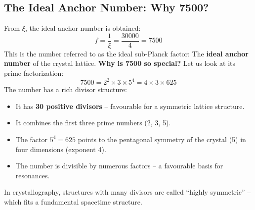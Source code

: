 	\subsection{The Ideal Anchor Number: Why 7500?}
	From \(\xi\), the ideal anchor number is obtained:
	\begin{equation}
		\boxed{f = \frac{1}{\xi} = \frac{30000}{4} = 7500}
	\end{equation}
	This is the number referred to as the ideal sub-Planck factor: The \textbf{ideal anchor number} of the crystal lattice.
	\textbf{Why is 7500 so special?} Let us look at its prime factorization:
	\begin{equation}
		7500 = 2^2 \times 3 \times 5^4 = 4 \times 3 \times 625
	\end{equation}
	The number has a rich divisor structure:
	\begin{itemize}
		\item It has \textbf{30 positive divisors} -- favourable for a symmetric lattice structure.
		\item It combines the first three prime numbers (2, 3, 5).
		\item The factor \(5^4 = 625\) points to the pentagonal symmetry of the crystal (5) in four dimensions (exponent 4).
		\item The number is divisible by numerous factors -- a favourable basis for resonances.
	\end{itemize}
	In crystallography, structures with many divisors are called \enquote{highly symmetric} -- which fits a fundamental spacetime structure.
